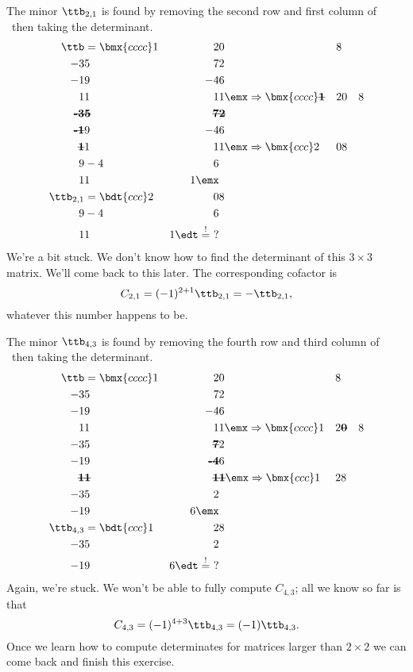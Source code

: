 {\drawexampleline%

The minor $\ttb_{2,1}$ is found by removing the second row and first column of \ttb\ then taking the determinant.
\begin{align*}
\ttb &= \bmx{cccc}1&2&0&8\\-3&5&7&2\\-1&9&-4&6\\1&1&1&1\emx \Rightarrow \bmx{cccc}\textbf{\sout{1}}&2&0&8\\ \textbf{\sout{-3}}&\textbf{\sout{5}}&\textbf{\sout{7}}&\textbf{\sout{2}}\\ \textbf{\sout{-1}}&9&-4&6\\ \textbf{\sout{1}}&1&1&1\emx \Rightarrow \bmx{ccc}2&0&8\\9&-4&6\\1&1&1\emx\\
\ttb_{2,1} &= \bdt{ccc}2&0&8\\9&-4&6\\1&1&1\edt \stackrel{!}{=} \ ?
\end{align*}
We're a bit stuck. We don't know how to find the determinant of this $3\times 3$ matrix. We'll come back to this later. The corresponding cofactor is
\[
C_{2,1} = (-1)^{2+1}\ttb_{2,1} = -\ttb_{2,1},
\]
whatever this number happens to be.


The minor $\ttb_{4,3}$ is found by removing the fourth row and third column of \ttb\ then taking the determinant.
\begin{align*}
\ttb &= \bmx{cccc}1&2&0&8\\-3&5&7&2\\-1&9&-4&6\\1&1&1&1\emx \Rightarrow \bmx{cccc}1&2&\textbf{\sout{0}}&8\\-3&5&\textbf{\sout{7}}&2\\-1&9&\textbf{\sout{-4}}&6\\ \textbf{\sout{1}}&\textbf{\sout{1}}&\textbf{\sout{1}}&\textbf{\sout{1}}\emx \Rightarrow \bmx{ccc}1&2&8\\-3&5&2\\-1&9&6\emx\\
\ttb_{4,3} &= \bdt{ccc}1&2&8\\-3&5&2\\-1&9&6\edt \stackrel{!}{=}\ ?
\end{align*}
Again, we're stuck. We won't be able to fully compute $C_{4,3}$; all we know so far is that
\[
C_{4,3} = (-1)^{4+3}\ttb_{4,3} = (-1)\ttb_{4,3}.
\]
Once we learn how to compute determinates for matrices larger than $2\times 2$ we can come back and finish this exercise.}

